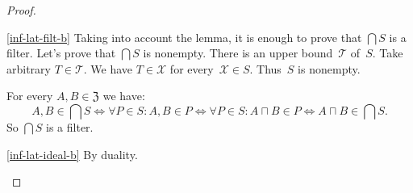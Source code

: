 \begin{proof}
~
\begin{widedisorder}
\item [\ref{inf-lat-filt-b}] Taking into account the lemma, it is enough
to prove that $\bigcap S$ is a filter.
Let's prove that $\bigcap S$ is nonempty.
There is an upper bound~$\mathcal{T}$ of~$S$. Take arbitrary
$T\in\mathcal{T}$. We have $T\in\mathcal{X}$ for
every~$\mathcal{X}\in S$. Thus~$S$ is nonempty.

For every $A,B\in\mathfrak{Z}$ we have:
\[
A,B\in\bigcap S\Leftrightarrow\forall P\in S:A,B\in P\Leftrightarrow\forall P\in S:A\sqcap B\in P\Leftrightarrow A\sqcap B\in\bigcap S.
\]
So $\bigcap S$ is a filter.
\item [\ref{inf-lat-ideal-b}] By duality.
\end{widedisorder}
\end{proof}

